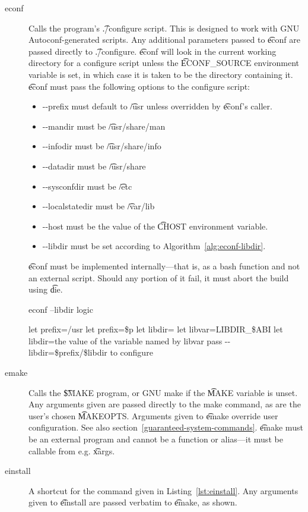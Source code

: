 \begin{description}
\item[econf] Calls the program's \t{./configure} script. This is designed to work with GNU
    Autoconf-generated scripts. Any additional parameters passed to \t{econf} are passed directly
    to \t{./configure}. \t{econf} will look in the current working directory for a configure script
    unless the \t{ECONF\_SOURCE} environment variable is set, in which case it is taken to be the
    directory containing it. \t{econf} must pass the following options to the configure script:
    \begin{itemize}
    \item -{}-prefix must default to \t{/usr} unless overridden by \t{econf}'s caller.
    \item -{}-mandir must be \t{/usr/share/man}
    \item -{}-infodir must be \t{/usr/share/info}
    \item -{}-datadir must be \t{/usr/share}
    \item -{}-sysconfdir must be \t{/etc}
    \item -{}-localstatedir must be \t{/var/lib}
    \item -{}-host must be the value of the \t{CHOST} environment variable.
    \item -{}-libdir must be set according to Algorithm~\ref{alg:econf-libdir}.
    \end{itemize}

    \t{econf} must be implemented internally---that is, as a bash function and not an external
    script. Should any portion of it fail, it must abort the build using \t{die}.

\begin{algorithm}
\caption{econf --libdir logic} \label{alg:econf-libdir}
\begin{algorithmic}[1]
\STATE let prefix=/usr
    \STATE let prefix=\$p
\ENDIF
\STATE let libdir=
    \STATE let libvar=LIBDIR\_\$ABI
        \STATE let libdir=the value of the variable named by libvar
    \ENDIF
\ENDIF
{}
    \STATE pass -{}-libdir=\$prefix/\$libdir to configure
\ENDIF
\end{algorithmic}
\end{algorithm}

\item[emake] Calls the \t{\$MAKE} program, or GNU make if the \t{MAKE} variable is unset.  Any
    arguments given are passed directly to the make command, as are the user's chosen \t{MAKEOPTS}\@.
    Arguments given to \t{emake} override user configuration. See also
    section~\ref{guaranteed-system-commands}. \t{emake} must be an external program and cannot be a
    function or alias---it must be callable from e.g. \t{xargs}.
\item[einstall] A shortcut for the command given in Listing~\ref{lst:einstall}. Any arguments given
    to \t{einstall} are passed verbatim to \t{emake}, as shown.


\end{description}
